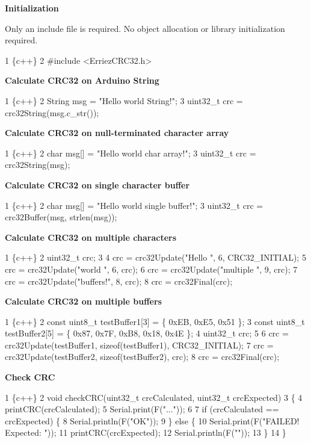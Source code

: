 {\bfseries Initialization}

Only an include file is required. No object allocation or library initialization required.


\begin{DoxyCode}
1 \{c++\}
2 #include <ErriezCRC32.h>
\end{DoxyCode}


{\bfseries Calculate C\+R\+C32 on Arduino String}


\begin{DoxyCode}
1 \{c++\}
2 String msg = "Hello world String!";
3 uint32\_t crc = crc32String(msg.c\_str());
\end{DoxyCode}


{\bfseries Calculate C\+R\+C32 on null-\/terminated character array}


\begin{DoxyCode}
1 \{c++\}
2 char msg[] = "Hello world char array!";
3 uint32\_t crc = crc32String(msg);
\end{DoxyCode}


{\bfseries Calculate C\+R\+C32 on single character buffer}


\begin{DoxyCode}
1 \{c++\}
2 char msg[] = "Hello world single buffer!";
3 uint32\_t crc = crc32Buffer(msg, strlen(msg));
\end{DoxyCode}


{\bfseries Calculate C\+R\+C32 on multiple characters}


\begin{DoxyCode}
1 \{c++\}
2 uint32\_t crc;
3 
4 crc = crc32Update("Hello ", 6, CRC32\_INITIAL);
5 crc = crc32Update("world ", 6, crc);
6 crc = crc32Update("multiple ", 9, crc);
7 crc = crc32Update("buffers!", 8, crc);
8 crc = crc32Final(crc);
\end{DoxyCode}


{\bfseries Calculate C\+R\+C32 on multiple buffers}


\begin{DoxyCode}
1 \{c++\}
2 const uint8\_t testBuffer1[3] = \{ 0xEB, 0xE5, 0x51 \};
3 const uint8\_t testBuffer2[5] = \{ 0x87, 0x7F, 0xB8, 0x18, 0x4E \};
4 uint32\_t crc;
5 
6 crc = crc32Update(testBuffer1, sizeof(testBuffer1), CRC32\_INITIAL);
7 crc = crc32Update(testBuffer2, sizeof(testBuffer2), crc);
8 crc = crc32Final(crc);
\end{DoxyCode}


{\bfseries Check C\+RC}


\begin{DoxyCode}
1 \{c++\}
2 void checkCRC(uint32\_t crcCalculated, uint32\_t crcExpected)
3 \{
4     printCRC(crcCalculated);
5     Serial.print(F("..."));
6 
7     if (crcCalculated == crcExpected) \{
8         Serial.println(F("OK"));
9     \} else \{
10         Serial.print(F("FAILED! Expected: "));
11         printCRC(crcExpected);
12         Serial.println(F(""));
13     \}
14 \}
\end{DoxyCode}


